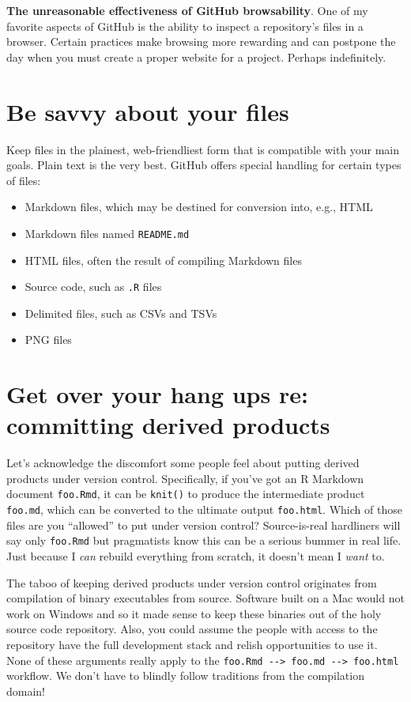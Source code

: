 \documentclass[
]{book}
\providecommand{\tightlist}{%
  \setlength{\itemsep}{0pt}\setlength{\parskip}{0pt}}
\begin{document}
\textbf{The unreasonable effectiveness of GitHub browsability}. One of my favorite aspects of GitHub is the ability to inspect a repository's files in a browser. Certain practices make browsing more rewarding and can postpone the day when you must create a proper website for a project. Perhaps indefinitely.

\section{Be savvy about your files}\label{be-savvy-about-your-files}

Keep files in the plainest, web-friendliest form that is compatible with your main goals. Plain text is the very best. GitHub offers special handling for certain types of files:

\begin{itemize}
\tightlist
\item
  Markdown files, which may be destined for conversion into, e.g., HTML
\item
  Markdown files named \texttt{README.md}
\item
  HTML files, often the result of compiling Markdown files
\item
  Source code, such as \texttt{.R} files
\item
  Delimited files, such as CSVs and TSVs
\item
  PNG files
\end{itemize}

\section{Get over your hang ups re: committing derived products}\label{get-over-your-hang-ups-re-committing-derived-products}

Let's acknowledge the discomfort some people feel about putting derived products under version control. Specifically, if you've got an R Markdown document \texttt{foo.Rmd}, it can be \texttt{knit()} to produce the intermediate product \texttt{foo.md}, which can be converted to the ultimate output \texttt{foo.html}. Which of those files are you ``allowed'' to put under version control? Source-is-real hardliners will say only \texttt{foo.Rmd} but pragmatists know this can be a serious bummer in real life. Just because I \emph{can} rebuild everything from scratch, it doesn't mean I \emph{want} to.

The taboo of keeping derived products under version control originates from compilation of binary executables from source. Software built on a Mac would not work on Windows and so it made sense to keep these binaries out of the holy source code repository. Also, you could assume the people with access to the repository have the full development stack and relish opportunities to use it. None of these arguments really apply to the \texttt{foo.Rmd\ -\/-\textgreater{}\ foo.md\ -\/-\textgreater{}\ foo.html} workflow. We don't have to blindly follow traditions from the compilation domain!
\end{document}
